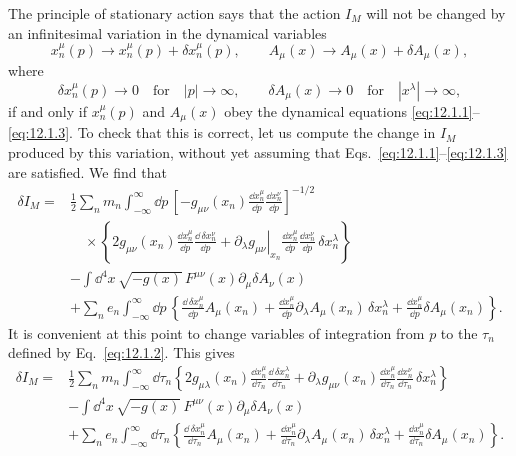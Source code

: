 The principle of stationary action says that the action \(I_M\) will not be
changed by an infinitesimal variation in the dynamical variables
\[
  x_n^\mu(p)\longrightarrow x_n^\mu(p)+\delta x_n^\mu(p),
  \qquad
  A_\mu(x)\longrightarrow A_\mu(x)+\delta A_\mu(x),
\]
where
\[
  \delta x_n^\mu(p)\longrightarrow0
  \quad\text{for}\quad |p|\longrightarrow\infty,
  \qquad
  \delta A_\mu(x)\longrightarrow0
  \quad\text{for}\quad |x^\lambda|\longrightarrow\infty,
\]
if and only if \(x_n^\mu(p)\) and \(A_\mu(x)\) obey the dynamical equations
\eqref{eq:12.1.1}--\eqref{eq:12.1.3}. To check that this is correct, let us
compute the change in \(I_M\) produced by this variation, without yet assuming
that Eqs.~\eqref{eq:12.1.1}--\eqref{eq:12.1.3} are satisfied. We find that
\[
\begin{aligned}
\delta I_M={}&
\frac12\sum_n m_n\int_{-\infty}^{\infty}\dd p\,
\left[
  -g_{\mu\nu}(x_n)
   \frac{\dd x_n^\mu}{\dd p}
   \frac{\dd x_n^\nu}{\dd p}
\right]^{-1/2}
\\[-2pt]
&\quad\times
\left\{
  2g_{\mu\nu}(x_n)
   \frac{\dd x_n^\mu}{\dd p}
   \frac{\dd\,\delta x_n^\nu}{\dd p}
  +\left.\partial_\lambda g_{\mu\nu}\right|_{x_n}
   \frac{\dd x_n^\mu}{\dd p}
   \frac{\dd x_n^\nu}{\dd p}\,
   \delta x_n^\lambda
\right\}
\\
&-\int\dd^4x\,\sqrt{-g(x)}\,F^{\mu\nu}(x)
  \partial_\mu\delta A_\nu(x)
\\
&+\sum_n e_n\int_{-\infty}^{\infty}\dd p\,
\left\{
  \frac{\dd\,\delta x_n^\mu}{\dd p}A_\mu(x_n)
  +\frac{\dd x_n^\mu}{\dd p}
   \partial_\lambda A_\mu(x_n)\,\delta x_n^\lambda
  +\frac{\dd x_n^\mu}{\dd p}\delta A_\mu(x_n)
\right\}.
\end{aligned}
\]
It is convenient at this point to change variables of integration from \(p\)
to the \(\tau_n\) defined by Eq.~\eqref{eq:12.1.2}. This gives
\[
\begin{aligned}
\delta I_M={}&
\frac12\sum_n m_n\int_{-\infty}^{\infty}\dd\tau_n
\left\{
  2g_{\mu\lambda}(x_n)
   \frac{\dd x_n^\mu}{\dd\tau_n}
   \frac{\dd\,\delta x_n^\lambda}{\dd\tau_n}
  +\partial_\lambda g_{\mu\nu}(x_n)
   \frac{\dd x_n^\mu}{\dd\tau_n}
   \frac{\dd x_n^\nu}{\dd\tau_n}\,
   \delta x_n^\lambda
\right\}
\\
&-\int\dd^4x\,\sqrt{-g(x)}\,F^{\mu\nu}(x)
  \partial_\mu\delta A_\nu(x)
\\
&+\sum_n e_n\int_{-\infty}^{\infty}\dd\tau_n
\left\{
  \frac{\dd\,\delta x_n^\mu}{\dd\tau_n}A_\mu(x_n)
  +\frac{\dd x_n^\mu}{\dd\tau_n}
   \partial_\lambda A_\mu(x_n)\,\delta x_n^\lambda
  +\frac{\dd x_n^\mu}{\dd\tau_n}\delta A_\mu(x_n)
\right\}.
\end{aligned}
\]
